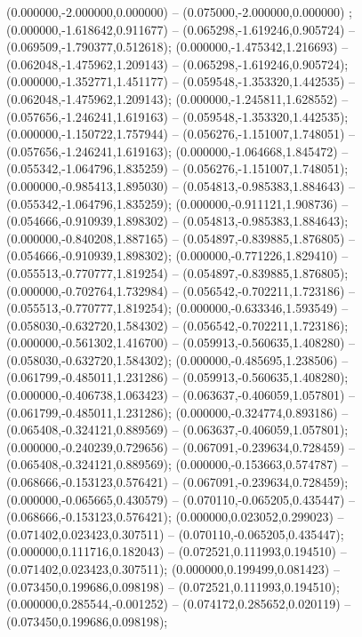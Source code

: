  (0.000000,-2.000000,0.000000) -- (0.075000,-2.000000,0.000000) ;
 (0.000000,-1.618642,0.911677) -- (0.065298,-1.619246,0.905724) -- (0.069509,-1.790377,0.512618);
 (0.000000,-1.475342,1.216693) -- (0.062048,-1.475962,1.209143) -- (0.065298,-1.619246,0.905724);
 (0.000000,-1.352771,1.451177) -- (0.059548,-1.353320,1.442535) -- (0.062048,-1.475962,1.209143);
 (0.000000,-1.245811,1.628552) -- (0.057656,-1.246241,1.619163) -- (0.059548,-1.353320,1.442535);
 (0.000000,-1.150722,1.757944) -- (0.056276,-1.151007,1.748051) -- (0.057656,-1.246241,1.619163);
 (0.000000,-1.064668,1.845472) -- (0.055342,-1.064796,1.835259) -- (0.056276,-1.151007,1.748051);
 (0.000000,-0.985413,1.895030) -- (0.054813,-0.985383,1.884643) -- (0.055342,-1.064796,1.835259);
 (0.000000,-0.911121,1.908736) -- (0.054666,-0.910939,1.898302) -- (0.054813,-0.985383,1.884643);
 (0.000000,-0.840208,1.887165) -- (0.054897,-0.839885,1.876805) -- (0.054666,-0.910939,1.898302);
 (0.000000,-0.771226,1.829410) -- (0.055513,-0.770777,1.819254) -- (0.054897,-0.839885,1.876805);
 (0.000000,-0.702764,1.732984) -- (0.056542,-0.702211,1.723186) -- (0.055513,-0.770777,1.819254);
 (0.000000,-0.633346,1.593549) -- (0.058030,-0.632720,1.584302) -- (0.056542,-0.702211,1.723186);
 (0.000000,-0.561302,1.416700) -- (0.059913,-0.560635,1.408280) -- (0.058030,-0.632720,1.584302);
 (0.000000,-0.485695,1.238506) -- (0.061799,-0.485011,1.231286) -- (0.059913,-0.560635,1.408280);
 (0.000000,-0.406738,1.063423) -- (0.063637,-0.406059,1.057801) -- (0.061799,-0.485011,1.231286);
 (0.000000,-0.324774,0.893186) -- (0.065408,-0.324121,0.889569) -- (0.063637,-0.406059,1.057801);
 (0.000000,-0.240239,0.729656) -- (0.067091,-0.239634,0.728459) -- (0.065408,-0.324121,0.889569);
 (0.000000,-0.153663,0.574787) -- (0.068666,-0.153123,0.576421) -- (0.067091,-0.239634,0.728459);
 (0.000000,-0.065665,0.430579) -- (0.070110,-0.065205,0.435447) -- (0.068666,-0.153123,0.576421);
 (0.000000,0.023052,0.299023) -- (0.071402,0.023423,0.307511) -- (0.070110,-0.065205,0.435447);
 (0.000000,0.111716,0.182043) -- (0.072521,0.111993,0.194510) -- (0.071402,0.023423,0.307511);
 (0.000000,0.199499,0.081423) -- (0.073450,0.199686,0.098198) -- (0.072521,0.111993,0.194510);
 (0.000000,0.285544,-0.001252) -- (0.074172,0.285652,0.020119) -- (0.073450,0.199686,0.098198);
